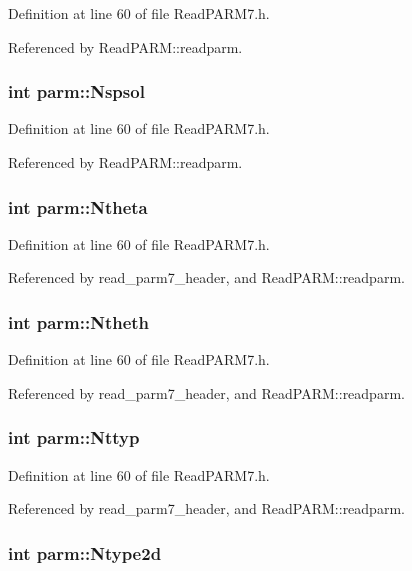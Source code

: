 Definition at line 60 of file Read\-PARM7.h.

Referenced by Read\-PARM::readparm.
\subsubsection{\setlength{\rightskip}{0pt plus 5cm}int parm::Nspsol}\label{structparm_m29}




Definition at line 60 of file Read\-PARM7.h.

Referenced by Read\-PARM::readparm.
\subsubsection{\setlength{\rightskip}{0pt plus 5cm}int parm::Ntheta}\label{structparm_m17}




Definition at line 60 of file Read\-PARM7.h.

Referenced by read\_\-parm7\_\-header, and Read\-PARM::readparm.
\subsubsection{\setlength{\rightskip}{0pt plus 5cm}int parm::Ntheth}\label{structparm_m8}




Definition at line 60 of file Read\-PARM7.h.

Referenced by read\_\-parm7\_\-header, and Read\-PARM::readparm.
\subsubsection{\setlength{\rightskip}{0pt plus 5cm}int parm::Nttyp}\label{structparm_m26}




Definition at line 60 of file Read\-PARM7.h.

Referenced by read\_\-parm7\_\-header, and Read\-PARM::readparm.
\subsubsection{\setlength{\rightskip}{0pt plus 5cm}int parm::Ntype2d}\label{structparm_m25}




